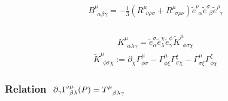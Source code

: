 \documentclass[letterpaper,10pt,english]{jupyterBook}
\begin{document}
\begin{equation*}
\begin{split}
B^{\mu}_{\ \ \alpha \beta \gamma} = -\frac{1}{3} \left( R^{\mu}_{\ \ \nu \rho \sigma} + R^{\mu}_{\ \ \sigma \rho \nu} \right) \widetilde{e}^{\nu}_{\ \ \alpha} \widetilde{e}^{\sigma}_{\ \ \beta} \widetilde{e}^{\rho}_{\ \ \gamma}
\end{split}
\end{equation*}\subsubsection*{ }
\begin{equation*}
\begin{split}K^{\mu}_{\ \ \alpha \lambda \gamma} = \widetilde{e}^{\sigma}_{\alpha} \widetilde{e}^{\chi}_{\lambda} \widetilde{e}^{\phi}_{\gamma}  \widetilde{K}^{\mu}_{\ \ \phi \sigma \chi }\end{split}
\end{equation*}\begin{equation*}
\begin{split}\widetilde{K}^{\mu}_{\ \ \phi \sigma \chi} := \partial_{\chi} \Gamma^{\mu}_{\phi \sigma} - \Gamma^{\mu}_{\phi \xi} \Gamma^{\xi}_{\sigma \chi} - \Gamma^{\mu}_{\sigma \xi} \Gamma^{\xi}_{\phi \chi}\end{split}
\end{equation*}\subsubsection*{Relation \protect\(\ \partial_{\gamma} {\Gamma'}^{\mu}_{\beta \lambda}(P) = T^{\mu}_{\ \ \beta \lambda \gamma}\protect\)}

\sphinxAtStartPar
{} 
\end{document}
